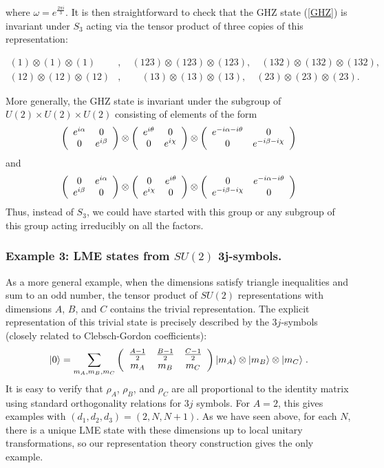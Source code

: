 \documentclass[12pt]{article}
\theoremstyle{definition}
\newcommand{\be}{\begin{equation}}
\newcommand{\ee}{\end{equation}}
\newcommand{\ba}{\begin{array}}
\newcommand{\ea}{\end{array}}
\begin{document}
where $\omega = e^{\frac{2 \pi i}{3}}$. It is
then straightforward to check that the GHZ state (\ref{GHZ}) is
invariant under $S_3$ acting via the tensor product of three copies of
this representation:

\begin{align*}
(1) \otimes (1) \otimes (1)&,\quad  (123) \otimes (123) \otimes
(123),\quad  (132)  \otimes (132)
 \otimes (132) ,\quad \\
 (12) \otimes
(12) \otimes (12)&,\quad \quad  (13) \otimes (13) \otimes
(13),\quad (23) \otimes (23) \otimes (23).
\end{align*}


More generally, the GHZ state is invariant under the subgroup of $U(2)
\times U(2) \times U(2)$ consisting of elements of the form \be \left(
\ba{cc} e^{i \alpha} & 0 \cr 0 & e^{i \beta} \ea \right) \otimes
\left( \ba{cc} e^{i \theta} & 0 \cr 0 & e^{i \chi} \ea \right) \otimes
\left( \ba{cc} e^{-i \alpha - i \theta} & 0 \cr 0 & e^{-i \beta - i
\chi} \ea \right) \ee and \be \left( \ba{cc} 0 & e^{i \alpha} \cr e^{i
\beta} & 0 \ea \right) \otimes \left( \ba{cc} 0 & e^{i \theta} \cr
e^{i \chi} & 0 \ea \right) \otimes \left( \ba{cc} 0 & e^{-i \alpha - i
\theta} \cr e^{-i \beta - i \chi} & 0 \ea \right) \ee Thus, instead of
$S_3$, we could have started with this group or any subgroup of this
group acting irreducibly on all the factors.

\subsubsection*{Example 3: LME states from $SU(2)$ 3j-symbols.}

As a more general example, when the dimensions satisfy triangle inequalities and sum to an odd number, the tensor product of $SU(2)$ representations with dimensions $A$, $B$, and $C$ contains the trivial representation. The explicit representation of this trivial state is precisely described by the $3j$-symbols (closely related to Clebsch-Gordon coefficients):
\be
|0 \rangle =  \sum_{m_A,m_B,m_C} \left( \ba{ccc} \frac{A - 1}{2} & \frac{B - 1}{2} & \frac{C - 1}{2} \cr 
m_A & m_B & m_C \ea \right) |m_A \rangle \otimes |m_B \rangle \otimes |m_C \rangle \; .
\ee
It is easy to verify that $\rho_A$, $\rho_B$, and $\rho_C$ are all proportional to the identity matrix using standard orthogonality relations for $3j$ symbols. For $A=2$, this gives examples with $(d_1,d_2,d_3) = (2,N,N+1)$. As we have seen above, for each $N$, there is a unique LME state with these dimensions up to local unitary transformations, so our representation theory construction gives the only example.
\end{document}
